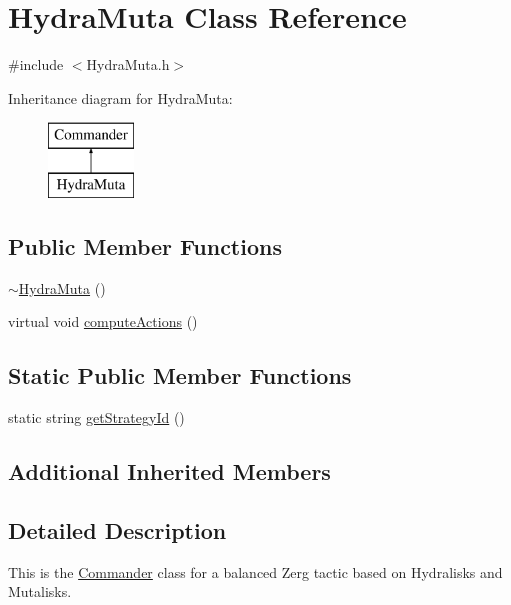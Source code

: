 \hypertarget{class_hydra_muta}{\section{Hydra\-Muta Class Reference}
\label{class_hydra_muta}
}


{\ttfamily \#include $<$Hydra\-Muta.\-h$>$}

Inheritance diagram for Hydra\-Muta\-:\begin{figure}[H]
\begin{center}
\leavevmode
\includegraphics[height=2.000000cm]{class_hydra_muta}
\end{center}
\end{figure}
\subsection*{Public Member Functions}
\begin{DoxyCompactItemize}
\item 
\hyperlink{class_hydra_muta_a19decdc9137c67ab5c650260bf3a6f77}{$\sim$\-Hydra\-Muta} ()
\item 
virtual void \hyperlink{class_hydra_muta_a7bd244b96aea47476415559c1f640ef1}{compute\-Actions} ()
\end{DoxyCompactItemize}
\subsection*{Static Public Member Functions}
\begin{DoxyCompactItemize}
\item 
static string \hyperlink{class_hydra_muta_a7e28ae416c89287e9cd08a431b06e293}{get\-Strategy\-Id} ()
\end{DoxyCompactItemize}
\subsection*{Additional Inherited Members}


\subsection{Detailed Description}
This is the \hyperlink{class_commander}{Commander} class for a balanced Zerg tactic based on Hydralisks and Mutalisks.

